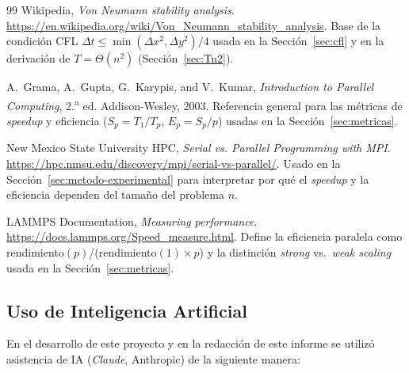 \documentclass[11pt,a4paper]{article}
\begin{document}
\begin{thebibliography}{99}
	Wikipedia, \textit{Von Neumann stability analysis}.
	\url{https://en.wikipedia.org/wiki/Von_Neumann_stability_analysis}. Base de la
	condición CFL $\Delta t \le \min(\Delta x^2,\Delta y^2)/4$ usada en la
	Sección~\ref{sec:cfl} y en la derivación de $T=\Theta(n^2)$
	(Sección~\ref{sec:Tn2}).

	A.\ Grama, A.\ Gupta, G.\ Karypis, and V.\ Kumar, \textit{Introduction to Parallel
	Computing}, 2.\textsuperscript{a} ed. Addison-Wesley, 2003. Referencia general
	para las métricas de \textit{speedup} y eficiencia ($S_p=T_1/T_p$,
	$E_p=S_p/p$) usadas en la Sección~\ref{sec:metricas}.

	New Mexico State University HPC, \textit{Serial vs. Parallel Programming with
	MPI}. \url{https://hpc.nmsu.edu/discovery/mpi/serial-vs-parallel/}. Usado en la
	Sección~\ref{sec:metodo-experimental} para interpretar por qué el
	\textit{speedup} y la eficiencia dependen del tamaño del problema $n$.

	LAMMPS Documentation, \textit{Measuring performance}.
	\url{https://docs.lammps.org/Speed_measure.html}. Define la eficiencia paralela
	como rendimiento$(p)$/(rendimiento$(1)\times p$) y la distinción \textit{strong}
	vs.\ \textit{weak scaling} usada en la Sección~\ref{sec:metricas}.

	\end{thebibliography}

	\subsection{Uso de Inteligencia Artificial}
	\enlargethispage{4 \baselineskip}
	En el desarrollo de este proyecto y en la redacción de este informe se utilizó
	asistencia de IA (\textit{Claude}, Anthropic) de la siguiente manera:
\end{document}
